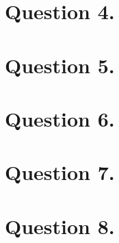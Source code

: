 \documentclass{article}
\begin{document}
\section*{Question 4.}

\section*{Question 5.}

\section*{Question 6.}

\section*{Question 7.}

\section*{Question 8.}
\end{document}
